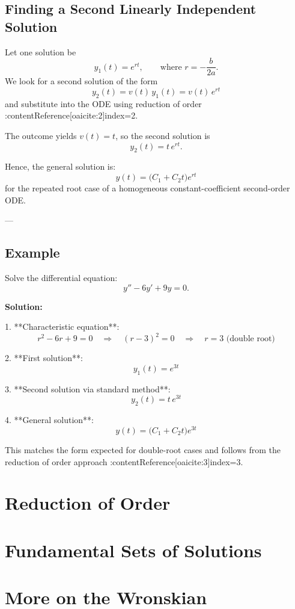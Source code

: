 \documentclass[12pt]{book}
\begin{document}
\subsection*{Finding a Second Linearly Independent Solution}

Let one solution be
\[
y_1(t) = e^{rt}, \qquad \text{where } r = -\frac{b}{2a}.
\]
We look for a second solution of the form
\[
y_2(t) = v(t)\,y_1(t) = v(t)\,e^{rt}
\]
and substitute into the ODE using reduction of order :contentReference[oaicite:2]{index=2}.

The outcome yields \(v(t) = t\), so the second solution is
\[
y_2(t) = t\,e^{rt}.
\]

Hence, the general solution is:
\[
\boxed{y(t) = \bigl(C_1 + C_2 t\bigr)e^{rt}}
\]
for the repeated root case of a homogeneous constant-coefficient second-order ODE.

---

\subsection*{Example}

Solve the differential equation:
\[
y'' - 6y' + 9y = 0.
\]

\textbf{Solution:}

1. **Characteristic equation**:
   \[
   r^2 - 6r + 9 = 0 \quad\Longrightarrow\quad (r - 3)^2 = 0 \quad\Rightarrow\quad r = 3 \text{ (double root)}
   \]

2. **First solution**:
   \[
   y_1(t) = e^{3t}
   \]

3. **Second solution via standard method**:
   \[
   y_2(t) = t\,e^{3t}
   \]

4. **General solution**:
   \[
   \boxed{y(t) = \bigl(C_1 + C_2 t\bigr)e^{3t}}
   \]

This matches the form expected for double-root cases and follows from the reduction of order approach :contentReference[oaicite:3]{index=3}.


\section{Reduction of Order}
\section{Fundamental Sets of Solutions}
\section{More on the Wronskian}
\end{document}
